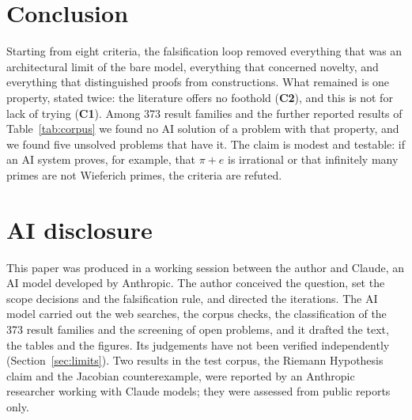 \documentclass[11pt,a4paper]{article}
\theoremstyle{prob}
\newcommand{\Cone}{\textbf{C1}}
\newcommand{\Ctwo}{\textbf{C2}}
\begin{document}
\FloatBarrier
\section{Conclusion}

Starting from eight criteria, the falsification loop removed everything that was an architectural limit of the bare model, everything that concerned novelty, and everything that distinguished proofs from constructions. What remained is one property, stated twice: the literature offers no foothold (\Ctwo), and this is not for lack of trying (\Cone). Among 373 result families and the further reported results of Table~\ref{tab:corpus} we found no AI solution of a problem with that property, and we found five unsolved problems that have it. The claim is modest and testable: if an AI system proves, for example, that $\pi+e$ is irrational or that infinitely many primes are not Wieferich primes, the criteria are refuted.

\section*{AI disclosure}

This paper was produced in a working session between the author and Claude, an AI model developed by Anthropic. The author conceived the question, set the scope decisions and the falsification rule, and directed the iterations. The AI model carried out the web searches, the corpus checks, the classification of the 373 result families and the screening of open problems, and it drafted the text, the tables and the figures. Its judgements have not been verified independently (Section~\ref{sec:limits}). Two results in the test corpus, the Riemann Hypothesis claim and the Jacobian counterexample, were reported by an Anthropic researcher working with Claude models; they were assessed from public reports only.
\end{document}
